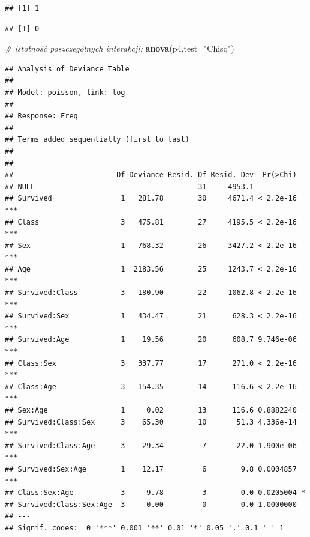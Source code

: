 \documentclass[polish,]{book}
\newenvironment{Shaded}{\begin{snugshade}}{\end{snugshade}}
\newcommand{\CommentTok}[1]{\textcolor[rgb]{0.56,0.35,0.01}{\textit{#1}}}
\newcommand{\DataTypeTok}[1]{\textcolor[rgb]{0.13,0.29,0.53}{#1}}
\newcommand{\DecValTok}[1]{\textcolor[rgb]{0.00,0.00,0.81}{#1}}
\newcommand{\KeywordTok}[1]{\textcolor[rgb]{0.13,0.29,0.53}{\textbf{#1}}}
\newcommand{\NormalTok}[1]{#1}
\newcommand{\OperatorTok}[1]{\textcolor[rgb]{0.81,0.36,0.00}{\textbf{#1}}}
\newcommand{\StringTok}[1]{\textcolor[rgb]{0.31,0.60,0.02}{#1}}
\begin{document}
\begin{Shaded}
\end{Shaded}

\begin{verbatim}
## [1] 1
\end{verbatim}

\begin{Shaded}
\end{Shaded}

\begin{verbatim}
## [1] 0
\end{verbatim}

\begin{Shaded}
\begin{Highlighting}[]
\CommentTok{# istotność poszczególnych interakcji:}
\KeywordTok{anova}\NormalTok{(p4,}\DataTypeTok{test=}\StringTok{"Chisq"}\NormalTok{)}
\end{Highlighting}
\end{Shaded}

\begin{verbatim}
## Analysis of Deviance Table
## 
## Model: poisson, link: log
## 
## Response: Freq
## 
## Terms added sequentially (first to last)
## 
## 
##                        Df Deviance Resid. Df Resid. Dev  Pr(>Chi)    
## NULL                                      31     4953.1              
## Survived                1   281.78        30     4671.4 < 2.2e-16 ***
## Class                   3   475.81        27     4195.5 < 2.2e-16 ***
## Sex                     1   768.32        26     3427.2 < 2.2e-16 ***
## Age                     1  2183.56        25     1243.7 < 2.2e-16 ***
## Survived:Class          3   180.90        22     1062.8 < 2.2e-16 ***
## Survived:Sex            1   434.47        21      628.3 < 2.2e-16 ***
## Survived:Age            1    19.56        20      608.7 9.746e-06 ***
## Class:Sex               3   337.77        17      271.0 < 2.2e-16 ***
## Class:Age               3   154.35        14      116.6 < 2.2e-16 ***
## Sex:Age                 1     0.02        13      116.6 0.8882240    
## Survived:Class:Sex      3    65.30        10       51.3 4.336e-14 ***
## Survived:Class:Age      3    29.34         7       22.0 1.900e-06 ***
## Survived:Sex:Age        1    12.17         6        9.8 0.0004857 ***
## Class:Sex:Age           3     9.78         3        0.0 0.0205004 *  
## Survived:Class:Sex:Age  3     0.00         0        0.0 1.0000000    
## ---
## Signif. codes:  0 '***' 0.001 '**' 0.01 '*' 0.05 '.' 0.1 ' ' 1
\end{verbatim}
\end{document}
